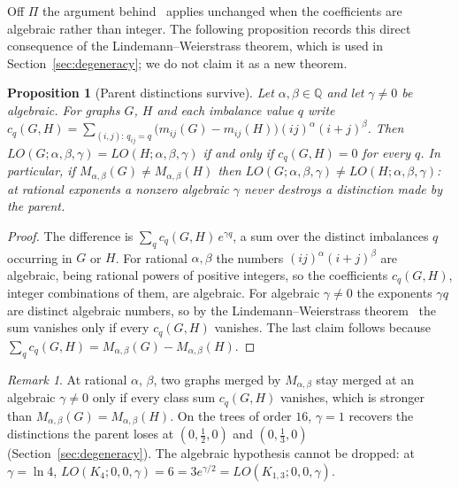 \documentclass[a5paper, 10pt]{article}
\theoremstyle{plain}
\newtheorem{proposition}[theorem]{Proposition}
\theoremstyle{remark}
\newtheorem*{remark}{Remark}
\theoremstyle{definition}
\begin{document}
  Off $\Pi$ the argument behind~\cite[Theorem~3.4]{Rada2019ExpVDB}
  applies unchanged when the coefficients are algebraic rather than
  integer. The following proposition records this direct consequence of
  the Lindemann--Weierstrass theorem, which is used in
  Section~\ref{sec:degeneracy}; we do not claim it as a new theorem.

  \begin{proposition}[Parent distinctions survive]\label{prop:offplane}
  Let $\alpha, \beta \in \mathbb{Q}$ and let $\gamma \ne 0$ be algebraic.
  For graphs $G$, $H$ and each imbalance value $q$ write
  $c_q(G,H) = \sum_{(i,j):\, q_{ij} = q} \bigl(m_{ij}(G) - m_{ij}(H)\bigr)
  (ij)^{\alpha} (i+j)^{\beta}$. Then
  $LO(G;\alpha,\beta,\gamma) = LO(H;\alpha,\beta,\gamma)$ if and only if
  $c_q(G,H) = 0$ for every $q$. In particular, if
  $M_{\alpha,\beta}(G) \ne M_{\alpha,\beta}(H)$ then
  $LO(G;\alpha,\beta,\gamma) \ne LO(H;\alpha,\beta,\gamma)$: at rational
  exponents a nonzero algebraic $\gamma$ never destroys a distinction
  made by the parent.
  \end{proposition}

  \begin{proof}
  The difference is $\sum_q c_q(G,H)\, e^{\gamma q}$, a sum over the
  distinct imbalances $q$ occurring in $G$ or $H$. For rational
  $\alpha, \beta$ the numbers $(ij)^{\alpha}(i+j)^{\beta}$ are
  algebraic, being rational powers of positive integers, so the
  coefficients $c_q(G,H)$, integer combinations of them, are algebraic. For
  algebraic $\gamma \ne 0$ the exponents $\gamma q$ are distinct algebraic
  numbers, so by the Lindemann--Weierstrass theorem~\cite{Baker1975}
  the sum vanishes only if every $c_q(G,H)$ vanishes. The last claim
  follows because $\sum_q c_q(G,H) = M_{\alpha,\beta}(G) - M_{\alpha,\beta}(H)$.
  \end{proof}

  \begin{remark}\label{rem:offplane}
  At rational $\alpha$, $\beta$, two graphs merged by $M_{\alpha,\beta}$
  stay merged at an algebraic $\gamma \neq 0$ only if every class sum $c_q(G,H)$ vanishes, which is
  stronger than $M_{\alpha,\beta}(G) = M_{\alpha,\beta}(H)$. On the trees
  of order $16$, $\gamma = 1$ recovers the distinctions the parent loses
  at $(0,\tfrac12,0)$ and $(0,\tfrac13,0)$
  (Section~\ref{sec:degeneracy}). The algebraic hypothesis cannot be
  dropped: at $\gamma = \ln 4$,
  $LO(K_4;0,0,\gamma) = 6 = 3e^{\gamma/2} = LO(K_{1,3};0,0,\gamma)$.
  \end{remark}
\end{document}
